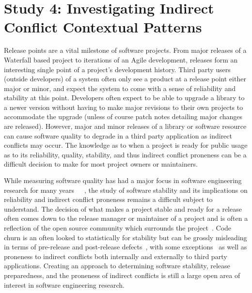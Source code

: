 \section{Study 4: Investigating Indirect Conflict Contextual Patterns}
\label{study:apie}

Release points are a vital milestone of software projects. From major releases of a Waterfall based project to iterations of an Agile development,
releases form an interesting single point of a project's development history.
Third party users (outside developers) of a system often only see a product at a release point either major or minor,
and expect the system to come with a sense of reliability and stability at this point. Developers often expect to be able to upgrade a library to
a newer version without having to make major revisions to their own projects to accommodate the upgrade (unless of course patch notes detailing major
changes are released). However, major and minor releases of a library or software resource can cause software quality to degrade in
a third party application as indirect conflicts may occur. The knowledge as to when a project is ready for public usage
as to its reliability, quality, stability, and thus indirect conflict proneness can be a difficult decision to make for most project owners or maintainers.

While measuring software quality has had a major focus in software engineering research for many years~\cite{Bowen:1978:CAS}~\cite{Grady:1993:PRM}~\cite{ISOIEC9126},
the study of software stability and its implications on reliability and indirect conflict proneness remains a difficult subject to understand. 
The decision of what makes a project stable and ready
for a release often comes down to the release manager or maintainer of a project and is often a reflection of the open source community which surrounds 
the project~\cite{Conway:1968}. Code churn is an often looked to statistically for stability but can be grossly misleading
in terms of pre-release and post-release defects~\cite{Fenton:2000:QAF}, with some exceptions~\cite{Nagappan:2005:URC} as well as proneness to indirect conflicts
both internally and externally to third party applications. 
Creating an approach to determining software stability, release preparedness, and the proneness of indirect conflicts is still a large open area of
interest in software engineering research.

